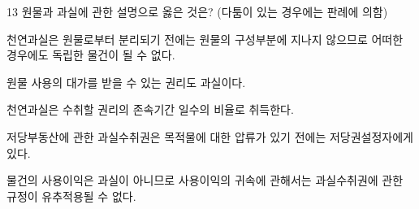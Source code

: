 \begin{question}{13}
원물과 과실에 관한 설명으로 옳은 것은? (다툼이 있는 경우에는 판례에 의함)
\begin{choices}
  \item 천연과실은 원물로부터 분리되기 전에는 원물의 구성부분에 지나지 않으므로 어떠한 경우에도 독립한 물건이 될 수 없다.
  \item 원물 사용의 대가를 받을 수 있는 권리도 과실이다.
  \item 천연과실은 수취할 권리의 존속기간 일수의 비율로 취득한다.
  \item 저당부동산에 관한 과실수취권은 목적물에 대한 압류가 있기 전에는 저당권설정자에게 있다.
  \item 물건의 사용이익은 과실이 아니므로 사용이익의 귀속에 관해서는 과실수취권에 관한 규정이 유추적용될 수 없다.
\end{choices}
\end{question}
